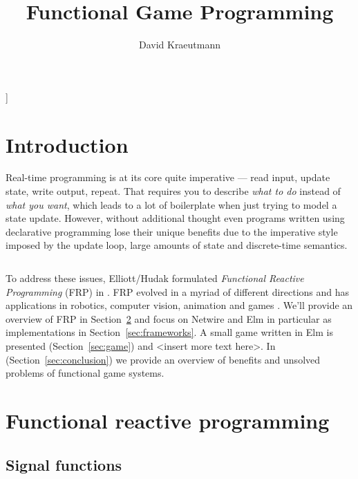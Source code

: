 \documentclass{article}
\title{Functional Game Programming}
\author{David Kraeutmann}
\begin{document}
\maketitle]

\section{Introduction}
Real-time programming is at its core quite imperative --- read input, update state, write output, repeat. 
That requires you to describe \emph{what to do} instead of \emph{what you want}, which leads to a lot of boilerplate when just trying to model a state update.
However, without additional thought even programs written using declarative programming lose their unique benefits due to the imperative style imposed by the update loop, large amounts of state and discrete-time semantics. 
\begin{listing}[ht]
\inputminted[breaklines=true]{haskell}{../vortrag_david/Loop.hs}
\label{lst:imperative}
\end{listing}

To address these issues, Elliott/Hudak formulated \emph{Functional Reactive Programming} (FRP) in \cite{ElliottHudak97:Fran}. FRP evolved in a myriad of different directions and has  applications in robotics, computer vision, animation and games \cite{haskell-wiki-yampa}. 
We'll provide an overview of FRP \cite{hudak2003arrows} in Section~\ref{sec:frp}
and focus on Netwire and Elm in particular as implementations in Section~\ref{sec:frameworks}.
A small game written in Elm is presented (Section~\ref{sec:game}) and <insert more text here>. 
In (Section~\ref{sec:conclusion}) we provide an overview of benefits and unsolved problems of functional game systems.

\section{Functional reactive programming}
\label{sec:frp}
\subsection{Signal functions}
\begin{figure}[ht]
\centering
{}
\label{fig:sigfunc}
\end{figure}
\end{document}
